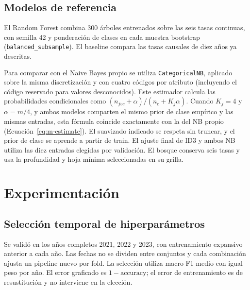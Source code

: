 \documentclass[conference]{IEEEtran}
\begin{document}
\subsection{Modelos de referencia}
El Random Forest combina 300 árboles entrenados sobre las seis tasas continuas, con semilla 42 y ponderación de clases en cada muestra bootstrap (\texttt{balanced\_subsample}). El baseline compara las tasas causales de diez años ya descritas.

Para comparar con el Naive Bayes propio se utiliza \texttt{CategoricalNB}, aplicado sobre la misma discretización y con cuatro códigos por atributo (incluyendo el código reservado para valores desconocidos). Este estimador calcula las probabilidades condicionales como $(n_{jvc}+\alpha)/(n_c+K_j\alpha)$. Cuando $K_j=4$ y $\alpha=m/4$, y ambos modelos comparten el mismo prior de clase empírico y las mismas entradas, esta fórmula coincide exactamente con la del NB propio (Ecuación~\ref{eq:m-estimate}). El suavizado indicado se respeta sin truncar, y el prior de clase se aprende a partir de train. El ajuste final de ID3 y ambos NB utiliza las diez entradas elegidas por validación. El bosque conserva seis tasas y usa la profundidad y hoja mínima seleccionadas en su grilla.

\section{Experimentación}
\label{sec:experimentacion}

\subsection{Selección temporal de hiperparámetros}
Se validó en los años completos 2021, 2022 y 2023, con entrenamiento expansivo anterior a cada año. Las fechas no se dividen entre conjuntos y cada combinación ajusta un pipeline nuevo por fold. La selección utiliza macro-F1 medio con igual peso por año. El error graficado es $1-\mathrm{accuracy}$; el error de entrenamiento es de resustitución y no interviene en la elección.
\end{document}
